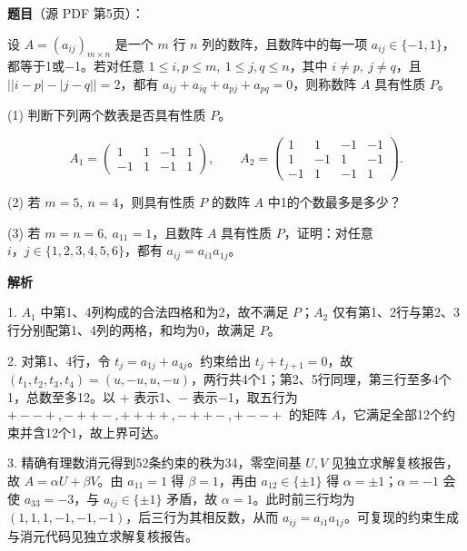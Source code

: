 \begin{answer}

\textbf{题目}（源 PDF 第5页）：

设 \(A=(a_{ij})_{m\times n}\) 是一个 \(m\) 行 \(n\) 列的数阵，且数阵中的每一项 \(a_{ij}\in\{-1,1\}\)，都等于1或$-$1。若对任意 \(1\leq i,p\leq m,\ 1\leq j,q\leq n\)，其中 \(i\ne p,\ j\ne q\)，且 \(\bigl\lvert\lvert i-p\rvert-\lvert j-q\rvert\bigr\rvert=2\)，都有 \(a_{ij}+a_{iq}+a_{pj}+a_{pq}=0\)，则称数阵 \(A\) 具有性质 \(P\)。

(1) 判断下列两个数表是否具有性质 \(P\)。

\nopagebreak[4]
\[
A_1=
\begin{pmatrix}
1&1&-1&1\\
-1&1&-1&1
\end{pmatrix},
\qquad
A_2=
\begin{pmatrix}
1&1&-1&-1\\
1&-1&1&-1\\
-1&1&-1&1
\end{pmatrix}.
\]

(2) 若 \(m=5,\ n=4\)，则具有性质 \(P\) 的数阵 \(A\) 中1的个数最多是多少？

(3) 若 \(m=n=6,\ a_{11}=1\)，且数阵 \(A\) 具有性质 \(P\)，证明：对任意 \(i\text{，}j\in\{1,2,3,4,5,6\}\)，都有 \(a_{ij}=a_{i1}a_{1j}\)。

\textbf{解析}


1. \(A_1\) 中第1、4列构成的合法四格和为2，故不满足 \(P\)；\(A_2\) 仅有第1、2行与第2、3行分别配第1、4列的两格，和均为0，故满足 \(P\)。

2. 对第1、4行，令 \(t_j=a_{1j}+a_{4j}\)。约束给出 \(t_j+t_{j+1}=0\)，故 \((t_1,t_2,t_3,t_4)=(u,-u,u,-u)\)，两行共4个1；第2、5行同理，第三行至多4个1，总数至多12。以 \(+\) 表示1、\(-\) 表示$-$1，取五行为 \(\mathtt{+--+},\mathtt{-++-},\mathtt{++++},\mathtt{-++-},\mathtt{+--+}\) 的矩阵 \(A\)，它满足全部12个约束并含12个1，故上界可达。

3. 精确有理数消元得到52条约束的秩为34，零空间基 \(U,V\) 见独立求解复核报告，故 \(A=\alpha U+\beta V\)。由 \(a_{11}=1\) 得 \(\beta=1\)，再由 \(a_{12}\in\{\pm1\}\) 得 \(\alpha=\pm1\)；\(\alpha=-1\) 会使 \(a_{33}=-3\)，与 \(a_{ij}\in\{\pm1\}\) 矛盾，故 \(\alpha=1\)。此时前三行均为 \((1,1,1,-1,-1,-1)\)，后三行为其相反数，从而 \(a_{ij}=a_{i1}a_{1j}\)。可复现的约束生成与消元代码见独立求解复核报告。




\end{answer}